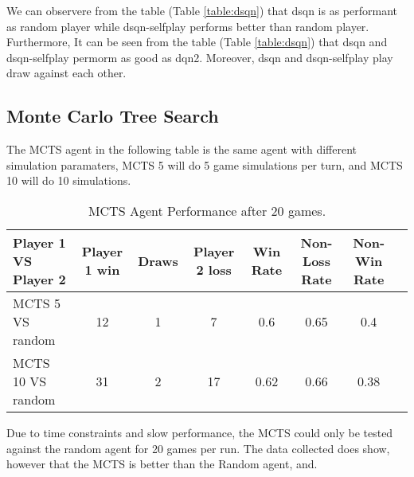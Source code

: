 \documentclass[../report.tex]{subfiles}
\begin{document}
We can observere from the table (Table \ref{table:dsqn}) that dsqn is as performant as random player while dsqn-selfplay performs better than random player. Furthermore, It can be seen from the table (Table \ref{table:dsqn}) that dsqn and dsqn-selfplay permorm as good as dqn2. Moreover, dsqn and dsqn-selfplay play draw against each other.

\subsection{Monte Carlo Tree Search}
The MCTS agent in the following table is the same agent with different simulation paramaters, MCTS 5 will do 5 game simulations per turn, and MCTS 10 will do 10 simulations.
\begin{table}[!htbp]
    \centering
    \caption{MCTS Agent Performance after 20 games.}\label{table:MCTS}
    \begin{tabular}{lccccccc}
        \toprule
        Player 1 VS Player 2            & Player 1 win & Draws & Player 2 loss & Win Rate & Non-Loss Rate & Non-Win Rate \\
        \midrule
        MCTS 5 VS random                  & 12    & 1    & 7      & 0.6        & 0.65             & 0.4            \\
        MCTS 10 VS random         & 31   & 2     & 17     & 0.62     & 0.66          & 0.38         \\
       \bottomrule
    \end{tabular}
\end{table}

Due to time constraints and slow performance, the MCTS could only be tested against the random agent for 20 games per run. The data collected does show, however that the MCTS is better than the Random agent, and.
\end{document}
